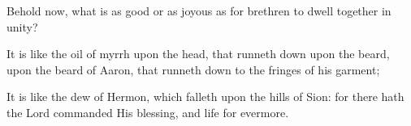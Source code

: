Behold now, what is as good or as joyous as for brethren to dwell together in unity?

It is like the oil of myrrh upon the head, that runneth down upon the beard, upon the beard of Aaron, that runneth down to the fringes of his garment;

It is like the dew of Hermon, which falleth upon the hills of Sion: for there hath the Lord commanded His blessing, and life for evermore.
